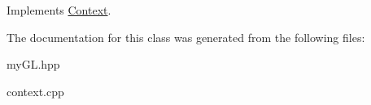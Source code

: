 Implements \hyperlink{classContext_ab47a1f761c1408d246ef99159b197d3a}{Context}.



The documentation for this class was generated from the following files\+:\begin{DoxyCompactItemize}
\item 
my\+G\+L.\+hpp\item 
context.\+cpp\end{DoxyCompactItemize}
